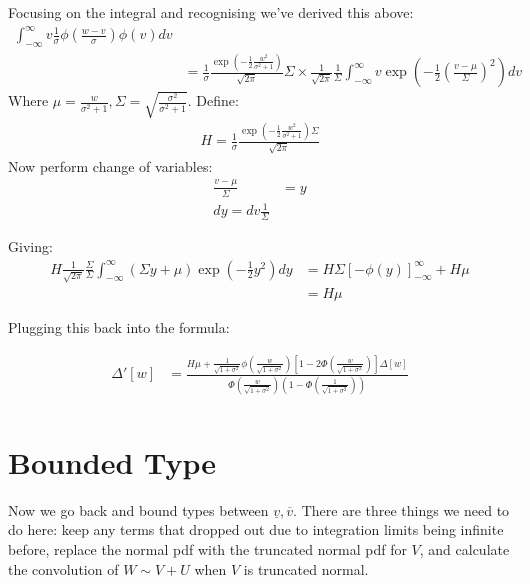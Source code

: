 \documentclass{article}
\begin{document}
Focusing on the integral and recognising we've derived this above:
\begin{align*}
    \int^\infty_{-\infty} v \frac{1}{\sigma}\phi\left(\frac{w - v}{\sigma}\right) \phi(v) dv \\ &=
    \frac{1}{\sigma} \frac{\exp\left(-\frac{1}{2}\frac{w^2}{\sigma^2 + 1}\right)}{
        \sqrt{2\pi}
    }
    \Sigma \times 
    \frac{1}{\sqrt{2\pi}}\frac{1}{\Sigma} \int^\infty_{-\infty}
    v \exp\left(
        -\frac{1}{2}
        \left(\frac{v - \mu}{\Sigma}\right)^2
    \right) dv
\end{align*}
Where $\mu = \frac{w}{\sigma^2 + 1}, \Sigma = \sqrt{\frac{\sigma^2}{\sigma^2 + 1}}$.
Define:
\begin{align*}
    H = \frac{1}{\sigma} \frac{
        \exp\left( 
            -\frac{1}{2}\frac{w^2}{\sigma^2 + 1}
        \right)\Sigma
    }{\sqrt{2\pi}}
\end{align*}
Now perform change of variables:
\begin{align*}
    \frac{v - \mu}{\Sigma} &= y \\
    dy = dv \frac{1}{\Sigma}
\end{align*}

Giving:
\begin{align*}
    H \frac{1}{\sqrt{2\pi}} \frac{\Sigma}{\Sigma} \int^\infty_{-\infty} \left(
        \Sigma y + \mu
    \right)\exp\left(-\frac{1}{2}y^2\right) dy &= 
H\Sigma \left[
    -\phi(y)
\right]^\infty_{-\infty} + H\mu \\
&= H\mu
\end{align*}


Plugging this back into the formula:

\begin{align*}
   \Delta'[w] &= 
   \frac{
    H\mu
    + \frac{1}{\sqrt{1 + \sigma^2}}\phi\left(\frac{w}{\sqrt{1 + \sigma^2}}\right) \left[
        1 - 2 \Phi(\frac{w}{\sqrt{1 + \sigma^2}})
    \right] \Delta[w]
   }{
    \Phi\left(\frac{w}{\sqrt{1 + \sigma^2}}\right)\left(1 - \Phi\left(\frac{1}{\sqrt{1 + \sigma^2}}\right)\right)
   } \\
\end{align*}

\section*{Bounded Type}

Now we go back and bound types between $\underline{v}, \overline{v}$. There are 
three things we need to do here: keep any terms that dropped out due to integration 
limits being infinite before, replace the normal pdf with the truncated normal pdf
for $V$, and calculate the convolution of $W\sim V + U$ when $V$ is truncated normal.
\end{document}
